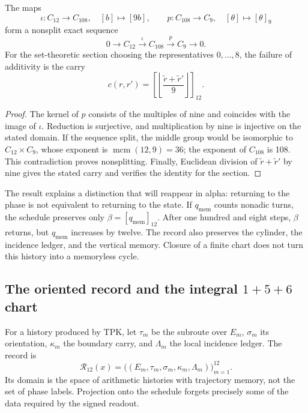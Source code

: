 \begin{proposition}
\label{prop:k-extension}
The maps
\[
 \iota:C_{12}\longrightarrow C_{108},\quad[b]\longmapsto[9b],
 \qquad p:C_{108}\longrightarrow C_9,\quad[\theta]\longmapsto[\theta]_9
\]
form a nonsplit exact sequence
\[
 0\longrightarrow C_{12}\xrightarrow{\iota}C_{108}
 \xrightarrow{p}C_9\longrightarrow0.
\]
For the set-theoretic section choosing the representatives
\(0,\ldots,8\), the failure of additivity is the carry
\[
 c(r,r')=\left[\left\lfloor\frac{\widetilde r+\widetilde r'}9\right\rfloor\right]_{12}.
\]
\end{proposition}

\begin{proof}
The kernel of \(p\) consists of the multiples of nine and coincides with
the image of \(\iota\). Reduction is surjective, and multiplication
by nine is injective on the stated domain. If the sequence
split, the middle group would be isomorphic to \(C_{12}\times C_9\), whose
exponent is \(\operatorname{mcm}(12,9)=36\); the exponent of
\(C_{108}\) is 108. This contradiction proves nonsplitting. Finally,
Euclidean division of \(\widetilde r+\widetilde r'\) by nine gives the
stated carry and verifies the identity for the section.
\end{proof}

The result explains a distinction that will reappear in alpha: returning to the
phase is not equivalent to returning to the state. If \(q_{\mathrm{mem}}\) counts
nonadic turns, the schedule preserves only
\(\beta=[q_{\mathrm{mem}}]_{12}\). After one hundred and eight steps,
\(\beta\) returns, but \(q_{\mathrm{mem}}\) increases by twelve. The
record also preserves the cylinder, the incidence ledger, and the vertical
memory. Closure of a finite chart does not turn this history into a
memoryless cycle.

\subsection{The oriented record and the integral \texorpdfstring{\(1+5+6\)}{1+5+6} chart}
\label{subsec:k-registro-integral}

For a history produced by TPK, let \(\tau_m\) be the subroute over
\(E_m\), \(\sigma_m\) its orientation, \(\kappa_m\) the boundary
carry, and \(\Lambda_m\) the local incidence ledger. The record is
\[
 \mathcal R_{12}(x)=
 \bigl((E_m,\tau_m,\sigma_m,\kappa_m,\Lambda_m)\bigr)_{m=1}^{12}.
\]
Its domain is the space of arithmetic histories with trajectory memory, not the set of
phase labels. Projection onto the schedule forgets precisely some
of the data required by the signed readout.

